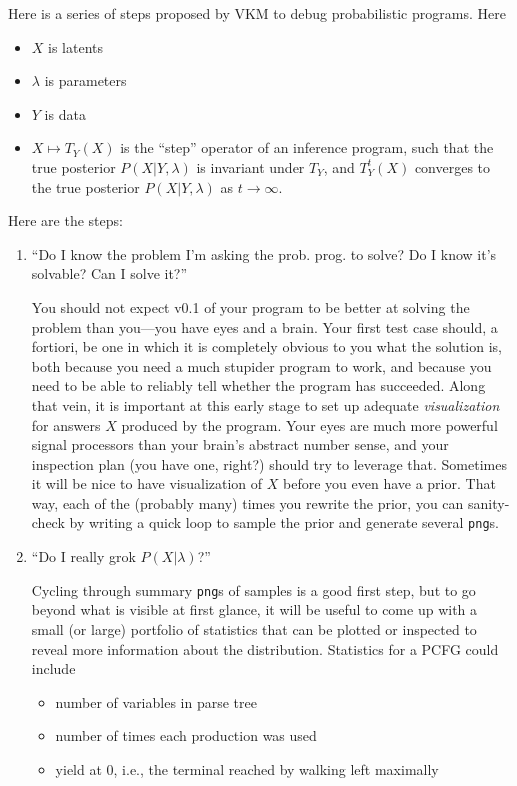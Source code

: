 \documentclass[11pt]{article}
\begin{document}
Here is a series of steps proposed by VKM to debug probabilistic programs.  Here
\begin{itemize}[noitemsep]
  \item $X$ is latents
  \item $\lambda$ is parameters
  \item $Y$ is data
  \item $X \mapsto T_Y(X)$ is the ``step'' operator of an inference program,
    such that the true posterior $P(X|Y,\lambda)$ is invariant under $T_Y$, and
    $T_Y^t(X)$ converges to the true posterior $P(X|Y,\lambda)$ as $t \to
    \infty$.
\end{itemize}

Here are the steps:
\begin{enumerate}
  \item ``Do I know the problem I'm asking the prob. prog. to solve?  Do I know
    it's solvable?  Can I solve it?''

    You should not expect v0.1 of your program to be better at solving the
    problem than you---you have eyes and a brain.  Your first test case should,
    a fortiori, be one in which it is completely obvious to you what the
    solution is, both because you need a much stupider program to work, and
    because you need to be able to reliably tell whether the program has
    succeeded.  Along that vein, it is important at this early stage to set up
    adequate {\em visualization} for answers $X$ produced by the program.  Your
    eyes are much more powerful signal processors than your brain's abstract
    number sense, and your inspection plan (you have one, right?) should try to
    leverage that.  Sometimes it will be nice to have visualization of $X$
    before you even have a prior.  That way, each of the (probably many) times
    you rewrite the prior, you can sanity-check by writing a quick loop to
    sample the prior and generate several \texttt{png}s.

  \item ``Do I really grok $P(X|\lambda)$?''

    Cycling through summary \texttt{png}s of samples is a good first step, but
    to go beyond what is visible at first glance, it will be useful to come up
    with a small (or large) portfolio of statistics that can be plotted or
    inspected to reveal more information about the distribution.  Statistics for
    a PCFG could include
    \begin{itemize}[noitemsep]
      \item number of variables in parse tree
      \item number of times each production was used
      \item yield at 0, i.e., the terminal reached by walking left maximally
    \end{itemize}


\end{enumerate}
\end{document}

